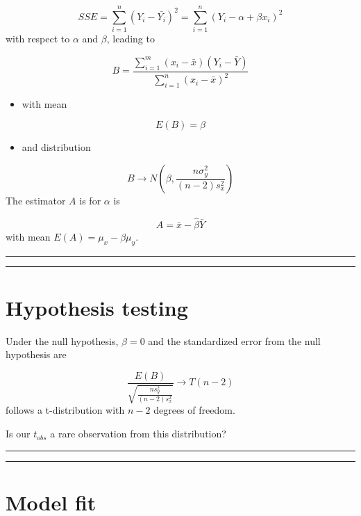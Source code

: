 \documentclass[
]{book}
\providecommand{\tightlist}{%
  \setlength{\itemsep}{0pt}\setlength{\parskip}{0pt}}
\begin{document}
\[SSE=\sum_{i=1}^n(Y_i-\bar{Y_i})^2=\sum_{i=1}^n(Y_i-\alpha + \beta x_i)^2\]
with respect to \(\alpha\) and \(\beta\), leading to

\[B=\frac{\sum_{i=1}^m(x_i-\bar{x})(Y_i-\bar{Y})}{\sum_{i=1}^n(x_i-\bar{x})^2}\]

\begin{itemize}
\tightlist
\item
  with mean
\end{itemize}

\[E(B)=\beta\]

\begin{itemize}
\tightlist
\item
  and distribution
\end{itemize}

\[B \rightarrow N(\beta, \frac{n\sigma^2_y}{{(n-2)s^2_x}})\]
The estimator \(A\) is for \(\alpha\) is

\[A=\bar{x}-\hat{\beta} \bar{Y}\]
with mean \(E(A)=\mu_x-\beta\mu_y\).

\begin{center}\rule{0.5\linewidth}{0.5pt}\end{center}

\begin{center}\rule{0.5\linewidth}{0.5pt}\end{center}

\hypertarget{hypothesis-testing-6}{%
\section{Hypothesis testing}\label{hypothesis-testing-6}}

Under the null hypothesis, \(\beta=0\) and the standardized error from the null hypothesis are

\[\frac{E(B)}{\sqrt{\frac{ns^2_y}{{(n-2)s^2_x}}}} \rightarrow T(n-2)\]
follows a t-distribution with \(n-2\) degrees of freedom.

Is our \(t_{obs}\) a rare observation from this distribution?

\begin{center}\rule{0.5\linewidth}{0.5pt}\end{center}

\begin{center}\rule{0.5\linewidth}{0.5pt}\end{center}

\hypertarget{model-fit}{%
\section{Model fit}\label{model-fit}}
\end{document}
